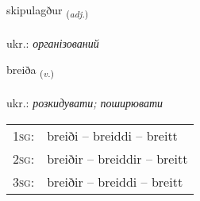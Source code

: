 \documentclass[frontgrid, backgrid]{flacards}\usepackage[]{graphicx}\usepackage[]{xcolor}
\begin{document}
\renewcommand{\flhead}{\vskip5pt \fboxsep=0pt {\small\bfseries\footnotesize Lýsingarorð | прикметник}}
\renewcommand{\fcfoot}{\vskip5pt \fboxsep=0pt \hspace{2pt}{\small\bfseries\footnotesize 2K}}

\renewcommand{\blhead}{\vskip5pt {\small\bfseries\footnotesize Lýsingarorð | прикметник }}
\renewcommand{\bcfoot}{\vskip5pt \hspace{2pt}{\small\bfseries\footnotesize 2K}}


{skipulagður \small{\textsubscript{(\textit{adj.})}} \\[1ex] %
\textphonetic{[scɪːpʏlaɣðʏr]} \\
ukr.: \emph{організований} \\  [2ex]
\renewcommand*{\arraystretch}{0.8}
}

\renewcommand{\flhead}{\vskip5pt \fboxsep=0pt {\small\bfseries\footnotesize Sagnorð | дієслово}}
\renewcommand{\fcfoot}{\vskip5pt \fboxsep=0pt \hspace{2pt}{\small\bfseries\footnotesize 2K}}

\renewcommand{\blhead}{\vskip5pt {\small\bfseries\footnotesize Sagnorð | дієслово }}
\renewcommand{\bcfoot}{\vskip5pt \hspace{2pt}{\small\bfseries\footnotesize 2K}}


{breiða \small{\textsubscript{(\textit{v.})}} \\[1ex] %
\textphonetic{[preiːða]} \\
ukr.: \emph{розкидувати; поширювати} \\  [2ex]
\renewcommand*{\arraystretch}{0.8}
\begin{tabular}{p{1cm}l}
\textsc{1sg}: & breiði -- breiddi -- breitt \\ 
\textsc{2sg}: & breiðir -- breiddir -- breitt \\ 
\textsc{3sg}: & breiðir -- breiddi -- breitt \\ 
\end{tabular}
}
\end{document}
